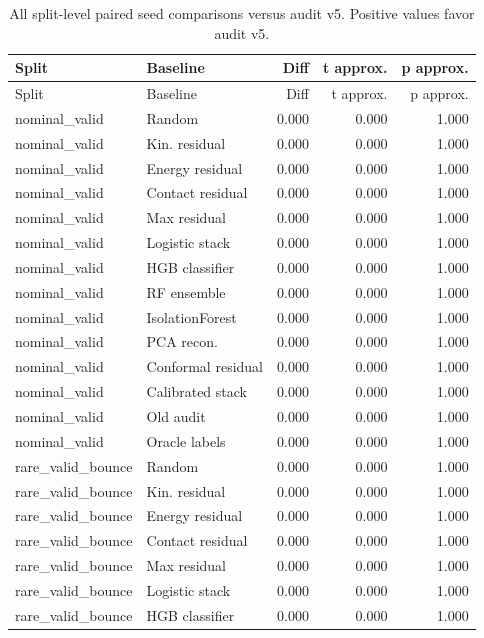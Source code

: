 {\scriptsize
\setlength{\tabcolsep}{3pt}
\begin{longtable}{llrrr}
\caption{All split-level paired seed comparisons versus audit v5. Positive values favor audit v5.}\label{tab:full-pairwise}\\
\toprule
Split & Baseline & Diff & t approx. & p approx. \\
\midrule
\endfirsthead
\toprule
Split & Baseline & Diff & t approx. & p approx. \\
\midrule
\endhead
nominal\_valid & Random & 0.000 & 0.000 & 1.000 \\
nominal\_valid & Kin. residual & 0.000 & 0.000 & 1.000 \\
nominal\_valid & Energy residual & 0.000 & 0.000 & 1.000 \\
nominal\_valid & Contact residual & 0.000 & 0.000 & 1.000 \\
nominal\_valid & Max residual & 0.000 & 0.000 & 1.000 \\
nominal\_valid & Logistic stack & 0.000 & 0.000 & 1.000 \\
nominal\_valid & HGB classifier & 0.000 & 0.000 & 1.000 \\
nominal\_valid & RF ensemble & 0.000 & 0.000 & 1.000 \\
nominal\_valid & IsolationForest & 0.000 & 0.000 & 1.000 \\
nominal\_valid & PCA recon. & 0.000 & 0.000 & 1.000 \\
nominal\_valid & Conformal residual & 0.000 & 0.000 & 1.000 \\
nominal\_valid & Calibrated stack & 0.000 & 0.000 & 1.000 \\
nominal\_valid & Old audit & 0.000 & 0.000 & 1.000 \\
nominal\_valid & Oracle labels & 0.000 & 0.000 & 1.000 \\
rare\_valid\_bounce & Random & 0.000 & 0.000 & 1.000 \\
rare\_valid\_bounce & Kin. residual & 0.000 & 0.000 & 1.000 \\
rare\_valid\_bounce & Energy residual & 0.000 & 0.000 & 1.000 \\
rare\_valid\_bounce & Contact residual & 0.000 & 0.000 & 1.000 \\
rare\_valid\_bounce & Max residual & 0.000 & 0.000 & 1.000 \\
rare\_valid\_bounce & Logistic stack & 0.000 & 0.000 & 1.000 \\
rare\_valid\_bounce & HGB classifier & 0.000 & 0.000 & 1.000 \\

\end{longtable}}
